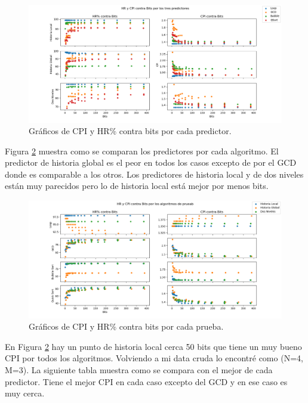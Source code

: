 \documentclass[a4paper]{article}
\begin{document}
\begin{figure}[!htb]
\centering
\includegraphics[scale=0.4]{./img/predictor_superplot}
\caption{Gráficos de CPI y HR\% contra bits por cada predictor.}
\label{fig:predictor_superplot}
\end{figure}

Figura \ref{fig:algos_superplot} muestra como se comparan los predictores por cada algoritmo. El predictor de historia global es el peor en todos los casos excepto de por el GCD donde es comparable a los otros. Los predictores de historia local y de dos niveles están muy parecidos pero lo de historia local está mejor por menos bits.

\begin{figure}[!htb]
\centering
\includegraphics[scale=0.4]{./img/algos_superplot}
\caption{Gráficos de CPI y HR\% contra bits por cada prueba.}
\label{fig:algos_superplot}
\end{figure}

En Figura \ref{fig:algos_superplot} hay un punto de historia local cerca 50 bits que tiene un muy bueno CPI por todos los algoritmos. Volviendo a mi data cruda lo encontré como (N=4, M=3). La siguiente tabla muestra como se compara con el mejor de cada predictor. Tiene el mejor CPI en cada caso excepto del GCD y en ese caso es muy cerca.
\end{document}
